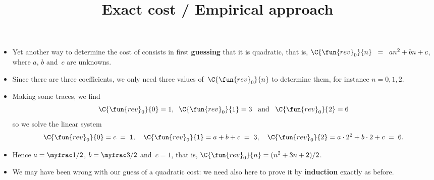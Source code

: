 \documentclass[wide]{slides}
\begin{document}
\begin{slide}
  \title{Exact cost / Empirical approach}

  \begin{itemize}

    \item Yet another way to determine the cost of 
      consists in first \textbf{guessing} that it is quadratic, that
      is, \(\C{\fun{rev}_0}{n} \;\; = \;\; an^2 + bn + c\), where
      \(a\), \(b\) and~\(c\) are unknowns.

    \item Since there are three coefficients, we only need three
      values of~\(\C{\fun{rev}_0}{n}\) to determine them, for instance
      \(n = 0, 1, 2\).

    \item Making some traces, we find
      \begin{equation*}
        \C{\fun{rev}_0}{0} = 1, \;\; \C{\fun{rev}_0}{1} = 3 \;\;\;
        \text{and} \;\;\; \C{\fun{rev}_0}{2} = 6
      \end{equation*}
      so we solve the linear system
      \begin{equation*}
        \C{\fun{rev}_0}{0} = c \; = \; 1,\quad
        \C{\fun{rev}_0}{1} = a + b + c \; = \; 3,\quad
        \C{\fun{rev}_0}{2} = a \cdot 2^2 + b \cdot 2 + c \; = \; 6.
      \end{equation*}

    \item Hence \(a = \myfrac1/2\), \(b = \myfrac3/2\) and~\(c = 1\),
      that is, \(\C{\fun{rev}_0}{n} = (n^2 + 3n + 2)/2\).

    \item We may have been wrong with our guess of a quadratic cost:
      we need also here to prove it by \textbf{induction} exactly as
      before.

  \end{itemize}

\end{slide}
\end{document}
